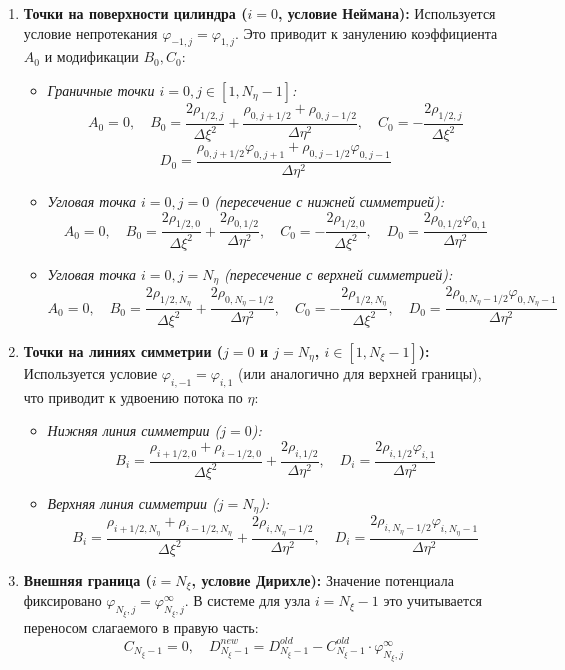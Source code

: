 	\begin{enumerate}
		\item \textbf{Точки на поверхности цилиндра ($i=0$, условие Неймана):} 
		Используется условие непротекания $\varphi_{-1,j} = \varphi_{1,j}$. Это приводит к занулению коэффициента $A_0$ и модификации $B_0, C_0$:
		\begin{itemize}
			\item \textit{Граничные точки $i=0, j \in [1, N_\eta-1]$:}
			\[ A_0 = 0, \quad B_0 = \frac{2\rho_{1/2,j}}{\Delta \xi^2} + \frac{\rho_{0,j+1/2} + \rho_{0,j-1/2}}{\Delta \eta^2}, \quad C_0 = -\frac{2\rho_{1/2,j}}{\Delta \xi^2} \]
			\[ D_0 = \frac{\rho_{0,j+1/2} \varphi_{0,j+1} + \rho_{0,j-1/2} \varphi_{0,j-1}}{\Delta \eta^2} \]
			
			\item \textit{Угловая точка $i=0, j=0$ (пересечение с нижней симметрией):}
			\[ A_0 = 0, \quad B_0 = \frac{2\rho_{1/2,0}}{\Delta \xi^2} + \frac{2\rho_{0,1/2}}{\Delta \eta^2}, \quad C_0 = -\frac{2\rho_{1/2,0}}{\Delta \xi^2}, \quad D_0 = \frac{2\rho_{0,1/2} \varphi_{0,1}}{\Delta \eta^2} \]
			
			\item \textit{Угловая точка $i=0, j=N_\eta$ (пересечение с верхней симметрией):}
			\[ A_0 = 0, \quad B_0 = \frac{2\rho_{1/2,N_\eta}}{\Delta \xi^2} + \frac{2\rho_{0,N_\eta-1/2}}{\Delta \eta^2}, \quad C_0 = -\frac{2\rho_{1/2,N_\eta}}{\Delta \xi^2}, \quad D_0 = \frac{2\rho_{0,N_\eta-1/2} \varphi_{0,N_\eta-1}}{\Delta \eta^2} \]
		\end{itemize}

		\item \textbf{Точки на линиях симметрии ($j=0$ и $j=N_\eta$, $i \in [1, N_\xi-1]$):} 
		Используется условие $\varphi_{i,-1} = \varphi_{i,1}$ (или аналогично для верхней границы), что приводит к удвоению потока по $\eta$:
		\begin{itemize}
			\item \textit{Нижняя линия симметрии ($j=0$):}
			\[ B_i = \frac{\rho_{i+1/2,0} + \rho_{i-1/2,0}}{\Delta \xi^2} + \frac{2\rho_{i,1/2}}{\Delta \eta^2}, \quad D_i = \frac{2\rho_{i,1/2} \varphi_{i,1}}{\Delta \eta^2} \]
			\item \textit{Верхняя линия симметрии ($j=N_\eta$):}
			\[ B_i = \frac{\rho_{i+1/2,N_\eta} + \rho_{i-1/2,N_\eta}}{\Delta \xi^2} + \frac{2\rho_{i,N_\eta-1/2}}{\Delta \eta^2}, \quad D_i = \frac{2\rho_{i,N_\eta-1/2} \varphi_{i,N_\eta-1}}{\Delta \eta^2} \]
		\end{itemize}

		\item \textbf{Внешняя граница ($i=N_\xi$, условие Дирихле):} 
		Значение потенциала фиксировано $\varphi_{N_\xi,j} = \varphi_{N_\xi,j}^\infty$. В системе для узла $i=N_\xi-1$ это учитывается переносом слагаемого в правую часть:
		\[ C_{N_\xi-1} = 0, \quad D_{N_\xi-1}^{new} = D_{N_\xi-1}^{old} - C_{N_\xi-1}^{old} \cdot \varphi_{N_\xi,j}^\infty \]

	\end{enumerate}
	
